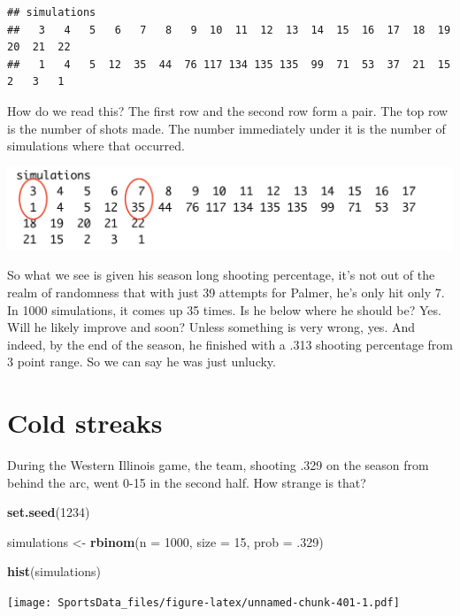 \documentclass[
]{book}
\newenvironment{Shaded}{\begin{snugshade}}{\end{snugshade}}
\newcommand{\DataTypeTok}[1]{\textcolor[rgb]{0.13,0.29,0.53}{#1}}
\newcommand{\DecValTok}[1]{\textcolor[rgb]{0.00,0.00,0.81}{#1}}
\newcommand{\FloatTok}[1]{\textcolor[rgb]{0.00,0.00,0.81}{#1}}
\newcommand{\KeywordTok}[1]{\textcolor[rgb]{0.13,0.29,0.53}{\textbf{#1}}}
\newcommand{\NormalTok}[1]{#1}
\newcommand{\StringTok}[1]{\textcolor[rgb]{0.31,0.60,0.02}{#1}}
\begin{document}
\begin{verbatim}
## simulations
##   3   4   5   6   7   8   9  10  11  12  13  14  15  16  17  18  19  20  21  22 
##   1   4   5  12  35  44  76 117 134 135 135  99  71  53  37  21  15   2   3   1
\end{verbatim}

How do we read this? The first row and the second row form a pair. The top row is the number of shots made. The number immediately under it is the number of simulations where that occurred.

\includegraphics[width=23.06in]{images/simulations1}

So what we see is given his season long shooting percentage, it's not out of the realm of randomness that with just 39 attempts for Palmer, he's only hit only 7. In 1000 simulations, it comes up 35 times. Is he below where he should be? Yes. Will he likely improve and soon? Unless something is very wrong, yes. And indeed, by the end of the season, he finished with a .313 shooting percentage from 3 point range. So we can say he was just unlucky.

\hypertarget{cold-streaks}{%
\section{Cold streaks}\label{cold-streaks}}

During the Western Illinois game, the team, shooting .329 on the season from behind the arc, went 0-15 in the second half. How strange is that?

\begin{Shaded}
\begin{Highlighting}[]
\KeywordTok{set.seed}\NormalTok{(}\DecValTok{1234}\NormalTok{)}

\NormalTok{simulations <-}\StringTok{ }\KeywordTok{rbinom}\NormalTok{(}\DataTypeTok{n =} \DecValTok{1000}\NormalTok{, }\DataTypeTok{size =} \DecValTok{15}\NormalTok{, }\DataTypeTok{prob =} \FloatTok{.329}\NormalTok{)}

\KeywordTok{hist}\NormalTok{(simulations)}
\end{Highlighting}
\end{Shaded}

\texttt{[image: SportsData\_files/figure-latex/unnamed-chunk-401-1.pdf]}
\end{document}
